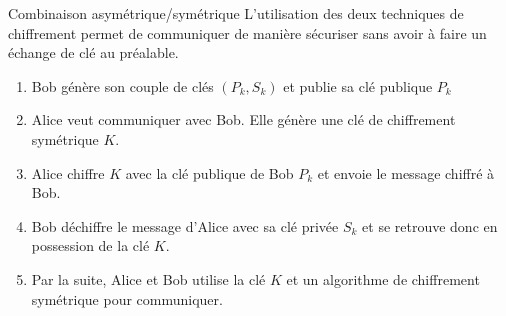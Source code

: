 \begin{frame}{Combinaison asymétrique/symétrique}
  L'utilisation des deux techniques de chiffrement permet de communiquer de manière sécuriser sans avoir à faire un échange de clé au préalable.

  \begin{enumerate}
    \item Bob génère son couple de clés $(P_k,S_k)$ et publie sa clé publique $P_k$
    \item Alice veut communiquer avec Bob. Elle génère une clé de chiffrement symétrique $K$.
    \item Alice chiffre $K$ avec la clé publique de Bob $P_k$ et envoie le message chiffré à Bob.
    \item Bob déchiffre le message d'Alice avec sa clé privée $S_k$ et se retrouve donc en possession de la clé $K$.
    \item Par la suite, Alice et Bob utilise la clé $K$ et un algorithme de chiffrement symétrique pour communiquer.
  \end{enumerate}
\end{frame}